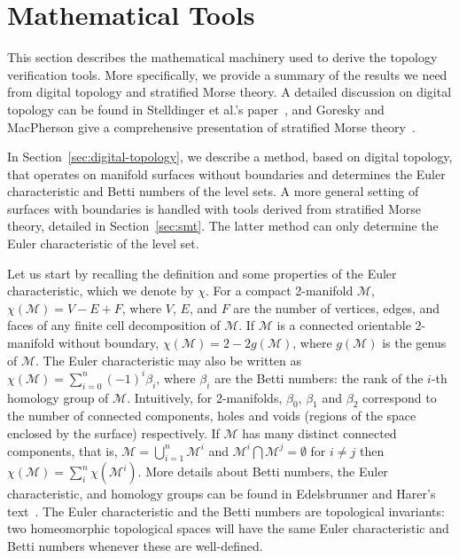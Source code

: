 \section{Mathematical Tools}
\label{sec:math-foundations}

This section describes the mathematical machinery used to derive the
topology verification tools. More specifically, we provide a summary
of the results we need from digital topology and stratified Morse
theory.  A detailed discussion on digital topology can be found in
Stelldinger et al.'s paper~\cite{siqueira:2007}, and Goresky and
MacPherson give a comprehensive presentation of stratified Morse
theory~\cite{Goresky:1988:SMT}.

In Section~\ref{sec:digital-topology}, we describe a method, based on
digital topology, that operates on manifold surfaces without
boundaries and determines the Euler characteristic and Betti numbers
of the level sets. A more general setting of surfaces with boundaries
is handled with tools derived from stratified Morse theory, detailed
in Section~\ref{sec:smt}.  The latter method can only determine the
Euler characteristic of the level set.

Let us start by recalling the definition and some properties of the
Euler characteristic, which we denote by $\chi$. For a compact
2-manifold $\mathcal{M}$, $\chi(\mathcal{M}) = V - E + F$, where $V$,
$E$, and $F$ are the number of vertices, edges, and faces of any finite
cell decomposition of $\mathcal{M}$. If $\mathcal{M}$ is a connected
orientable 2-manifold without boundary, $\chi(\mathcal{M}) = 2 -
2g(\mathcal{M})$, where $g(\mathcal{M})$ is the genus of
$\mathcal{M}$. The Euler characteristic may also be written as
$\chi(\mathcal{M}) = \sum_{i=0}^n(-1)^i \beta_i$, where $\beta_i$ are
the Betti numbers: the rank of the $i$-th homology group of
$\mathcal{M}$.
Intuitively, for 2-manifolds, $\beta_0$, $\beta_1$ and $\beta_2$
correspond to the number of connected components, holes and voids
(regions of the space enclosed by the surface) respectively.  If
$\mathcal{M}$ has many distinct connected components, that is,
$\mathcal{M} = \bigcup^n_{i = 1} \mathcal{M}^i$ and $\mathcal{M}^i
\bigcap \mathcal{M}^j = \emptyset$ for $i \neq j$ then
$\chi(\mathcal{M}) = \sum_{i}^n \chi(\mathcal{M}^i)$. More details
about Betti numbers, the Euler characteristic, and homology groups can
be found in Edelsbrunner and Harer's text~\cite{edelsbrunner10}. The
Euler characteristic and the Betti numbers are topological invariants:
two homeomorphic topological spaces will have the same Euler
characteristic and Betti numbers whenever these are well-defined.


